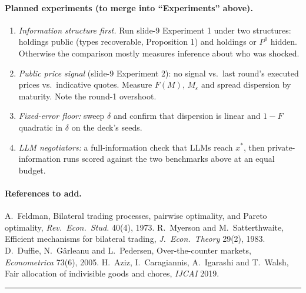 \paragraph{Planned experiments (to merge into ``Experiments'' above).}
\begin{enumerate}
\item \emph{Information structure first.} Run slide-9 Experiment 1 under two structures: holdings public (types recoverable, Proposition 1) and holdings or $P^0$ hidden. Otherwise the comparison mostly measures inference about who was shocked.
\item \emph{Public price signal} (slide-9 Experiment 2): no signal vs.\ last round's executed prices vs.\ indicative quotes. Measure $F(M)$, $M_\varepsilon$ and spread dispersion by maturity. Note the round-1 overshoot.
\item \emph{Fixed-error floor:} sweep $\delta$ and confirm that dispersion is linear and $1-F$ quadratic in $\delta$ on the deck's seeds.
\item \emph{LLM negotiators:} a full-information check that LLMs reach $x^*$, then private-information runs scored against the two benchmarks above at an equal budget.
\end{enumerate}

\paragraph{References to add.}
A.~Feldman, Bilateral trading processes, pairwise optimality, and Pareto optimality, \emph{Rev.\ Econ.\ Stud.} 40(4), 1973.
R.~Myerson and M.~Satterthwaite, Efficient mechanisms for bilateral trading, \emph{J.\ Econ.\ Theory} 29(2), 1983.
D.~Duffie, N.~G\^arleanu and L.~Pedersen, Over-the-counter markets, \emph{Econometrica} 73(6), 2005.
H.~Aziz, I.~Caragiannis, A.~Igarashi and T.~Walsh, Fair allocation of indivisible goods and chores, \emph{IJCAI} 2019.

\noindent\rule{\linewidth}{0.6pt}

